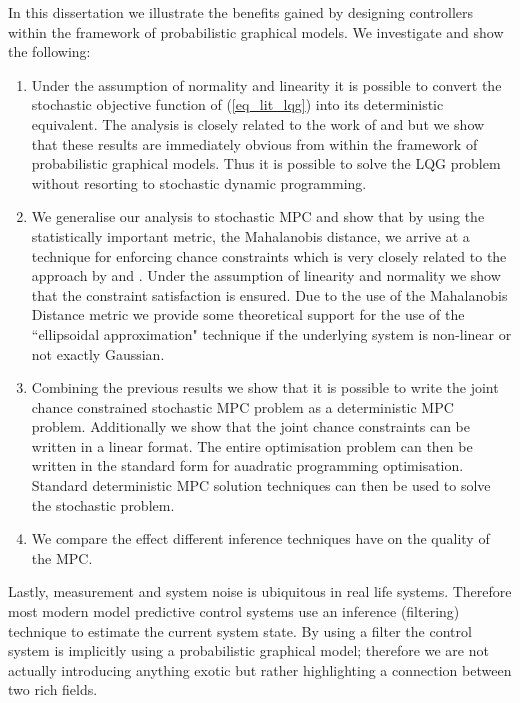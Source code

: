 In this dissertation we illustrate the benefits gained by designing controllers within the framework of probabilistic graphical models. We investigate and show the following:
\begin{enumerate}
\item
Under the assumption of normality and linearity it is possible to convert the stochastic objective function of (\ref{eq_lit_lqg}) into its deterministic equivalent. The analysis is closely related to the work of  \cite{yan1} and \cite{yan2} but we show that these results are immediately obvious from within the framework of probabilistic graphical models. Thus it is possible to solve the LQG problem without resorting to stochastic dynamic programming.
\item
We generalise our analysis to stochastic MPC and show that by using the statistically important metric, the Mahalanobis distance, we arrive at a technique for enforcing chance constraints which is very closely related to the approach by \cite{vanhessem2} and \cite{vanhessem1}. Under the assumption of linearity and normality we show that the constraint satisfaction is ensured. Due to the use of the Mahalanobis Distance metric we provide some theoretical support for the use of the ``ellipsoidal approximation" technique if the underlying system is non-linear or not exactly Gaussian.
\item
Combining the previous results we show that it is possible to write the joint chance constrained stochastic MPC problem as a deterministic MPC problem. Additionally we show that the joint chance constraints can be written in a linear format. The entire optimisation problem can then be written in the standard form for auadratic programming optimisation. Standard deterministic MPC solution techniques can then be used to solve the stochastic problem.
\item
We compare the effect different inference techniques have on the quality of the MPC.
\end{enumerate}
Lastly, measurement and system noise is ubiquitous in real life systems. Therefore most modern model predictive control systems use an inference (filtering) technique to estimate the current system state. By using a filter the control system is implicitly using a probabilistic graphical model; therefore we are not actually introducing anything exotic but rather highlighting a connection between two rich fields. 

